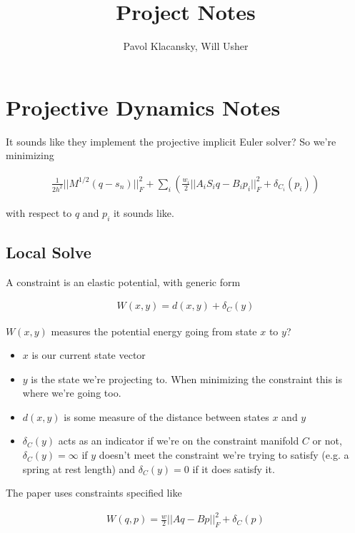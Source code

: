 \documentclass[11pt]{article}
\begin{document}
\title{Project Notes}
\author{Pavol Klacansky, Will Usher}
\maketitle

\section{Projective Dynamics Notes}

It sounds like they implement the projective implicit Euler solver? So we're minimizing

\begin{align}
	\frac{1}{2 h^2} || M^{1/2} (q - s_n) ||^2_F + \sum_i \left( \frac{w_i}{2} || A_i S_i q - B_i p_i ||^2_F
		+ \delta_{C_i} (p_i) \right)
\end{align}

with respect to $q$ and $p_i$ it sounds like.

\subsection{Local Solve}

A constraint is an elastic potential, with generic form

\begin{align}
	W(x, y) = d(x, y) + \delta_C(y)
\end{align}

$W(x, y)$ measures the potential energy going from state $x$ to $y$?

\begin{itemize}
	\item $x$ is our current state vector
	\item $y$ is the state we're projecting to. When minimizing the constraint this is
		where we're going too.
	\item $d(x, y)$ is some measure of the distance between states $x$ and $y$
	\item $\delta_C(y)$ acts as an indicator if we're on the constraint manifold $C$ or not,
		$\delta_C(y) = \infty$ if $y$ doesn't meet the constraint we're trying to satisfy (e.g. a
		spring at rest length) and $\delta_C(y) = 0$ if it does satisfy it.
\end{itemize}

The paper \cite{projective_dynamics} uses constraints specified like

\begin{align}
	W(q, p) = \frac{w}{2} || A q - B p ||^2_F + \delta_C(p)
\end{align}
\end{document}
